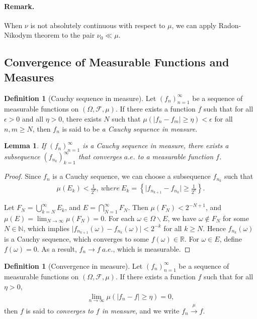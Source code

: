 \documentclass{article}
\numberwithin{equation}{section}
\theoremstyle{plain}
\newtheorem{lemma}[theorem]{Lemma}
\theoremstyle{definition}
\newtheorem{definition}[theorem]{Definition}
\begin{document}
\paragraph{Remark.} When $\nu$ is not absolutely continuous with respect to $\mu$, we can apply Radon-Nikodym theorem to the pair $\nu_0\ll\mu$.

\newpage
\subsection{Convergence of Measurable Functions and Measures}
\label{sec:1.6}
\begin{definition}[Cauchy sequence in measure]\label{def:1.62} Let $(f_n)_{n=1}^\infty$ be a sequence of measurable functions on $(\Omega,\mathscr{F},\mu)$. If there exists a function $f$ such that for all $\epsilon>0$ and all $\eta>0$, there exists $N$ such that $\mu(\vert f_n-f_m\vert\geq\eta)<\epsilon$ for all $n,m\geq N$, then $f_n$ is said to be \textit{a Cauchy sequence in measure}.
\end{definition}
\begin{lemma}\label{lemma:1.63} If $(f_n)_{n=1}^\infty$ is a Cauchy sequence in measure, there exists a subsequence $(f_{n_k})_{k=1}^\infty$ that converges $a.e.$ to a measurable function $f$.
\end{lemma}
\begin{proof}
Since $f_n$ is a Cauchy sequence, we can choose a subsequence $f_{n_k}$ such that
\begin{align*}
	\mu\left(E_k\right) < \frac{1}{2^k},\ \textit{where}\ E_k=\left\{\vert f_{n_{k+1}}-f_{n_k}\vert\geq \frac{1}{2^k}\right\}.
\end{align*}

Let $F_N=\bigcup_{k=N}^\infty E_k$, and $E=\bigcap_{N=1}^\infty F_N$. Then $\mu(F_N)<2^{-N+1}$, and $\mu(E)=\lim_{N\to\infty}\mu(F_N)=0$. For each $\omega\in\Omega\backslash E$, we have $\omega\notin F_N$ for some $N\in\mathbb{N}$, which implies $\vert f_{n_{k+1}}(\omega)-f_{n_k}(\omega)\vert<2^{-k}$ for all $k\geq N$. Hence $f_{n_k}(\omega)$ is a Cauchy sequence, which converges to some $f(\omega)\in\mathbb{R}$. For $\omega\in E$, define $f(\omega)=0$. As a result, $f_n\to f\ a.e.$, which is measurable.
\end{proof}

\begin{definition}[Convergence in measure]\label{def:1.64} Let $(f_n)_{n=1}^\infty$ be a sequence of measurable functions on $(\Omega,\mathscr{F},\mu)$. If there exists a function $f$ such that for all $\eta>0$,
\begin{align*}
	\lim_{n\to\infty}\mu\left(\vert f_n-f\vert\geq\eta\right) = 0,
\end{align*}
then $f$ is said to \textit{converges to $f$ in measure}, and we write $f_n\overset{\mu}{\to}f$.
\end{definition}
\end{document}
